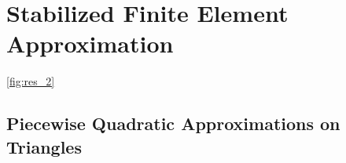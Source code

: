 \documentclass[../Dissertation]{subfiles}
\begin{document}
  \section{Stabilized Finite Element Approximation}\label{sec:stabFEappr}
  \lipsum[64] \cref{fig:res_2}
  
  
  \subsection{Piecewise Quadratic Approximations on Triangles}\label{subsec:powell_sabin}
  
  
\end{document}

